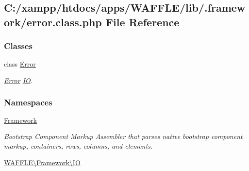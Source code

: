 \hypertarget{error_8class_8php}{}\subsection{C\+:/xampp/htdocs/apps/\+W\+A\+F\+F\+L\+E/lib/.framework/error.class.\+php File Reference}
\label{error_8class_8php}
\subsubsection*{Classes}
\begin{DoxyCompactItemize}
\item 
class \hyperlink{class_w_a_f_f_l_e_1_1_framework_1_1_i_o_1_1_error}{Error}
\begin{DoxyCompactList}\small\item\em \hyperlink{class_w_a_f_f_l_e_1_1_framework_1_1_i_o_1_1_error}{Error} \hyperlink{namespace_w_a_f_f_l_e_1_1_framework_1_1_i_o}{IO}. \end{DoxyCompactList}\end{DoxyCompactItemize}
\subsubsection*{Namespaces}
\begin{DoxyCompactItemize}
\item 
 \hyperlink{namespace_framework}{Framework}
\begin{DoxyCompactList}\small\item\em Bootstrap Component Markup Assembler that parses native bootstrap component markup, containers, rows, columns, and elements. \end{DoxyCompactList}\item 
 \hyperlink{namespace_w_a_f_f_l_e_1_1_framework_1_1_i_o}{W\+A\+F\+F\+L\+E\textbackslash{}\+Framework\textbackslash{}\+IO}
\end{DoxyCompactItemize}
